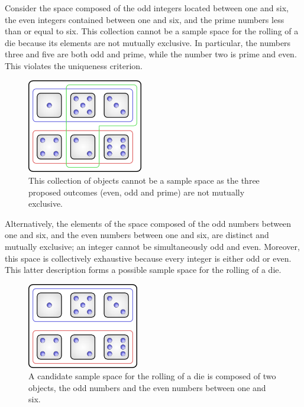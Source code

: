 \begin{example}
Consider the space composed of the odd integers located between one and six, the even integers contained between one and six, and the prime numbers less than or equal to six.
This collection cannot be a sample space for the rolling of a die because its elements are not mutually exclusive.
In particular, the numbers three and five are both odd and prime, while the number two is prime and even.
This violates the uniqueness criterion.

\begin{figure}[htb!]
\begin{center}
\includegraphics[height=4.125cm]{Figures/2Chapter/nonadmissiblespace}
\caption{This collection of objects cannot be a sample space as the three proposed outcomes (even, odd and prime) are not mutually exclusive.}
\end{center}
\end{figure}

Alternatively, the elements of the space composed of the odd numbers between one and six, and the even numbers between one and six, are distinct and mutually exclusive;
an integer cannot be simultaneously odd and even.
Moreover, this space is collectively exhaustive because every integer is either odd or even.
This latter description forms a possible sample space for the rolling of a die.

\begin{figure}[htb!]
\begin{center}
\includegraphics[height=3.75cm]{Figures/2Chapter/admissiblespace}
\end{center}
\caption{A candidate sample space for the rolling of a die is composed of two objects, the odd numbers and the even numbers between one and six.}
\end{figure}
\end{example}


